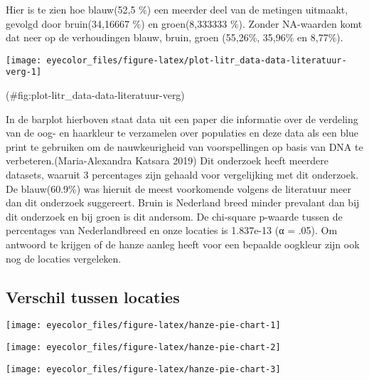 \documentclass[
]{article}
\let\origfigure\figure
\let\endorigfigure\endfigure
\renewenvironment{figure}[1][2] {
    \expandafter\origfigure\expandafter[H]
} {
    \endorigfigure
}
\begin{document}
Hier is te zien hoe blauw(52,5 \%) een meerder deel van de metingen
uitmaakt, gevolgd door bruin(34,16667 \%) en groen(8,333333 \%). Zonder
NA-waarden komt dat neer op de verhoudingen blauw, bruin, groen (55,26\%,
35,96\% en 8,77\%).

\begin{figure}
\texttt{[image: eyecolor\_files/figure-latex/plot-litr\_data-data-literatuur-verg-1]} \caption{Barplot met oogkleur in percentage voorkomst en oogkleur percentage uit data uit de literatuur. Meerderheid waargenomen door analisten van het rechter oogkleur. Oogkleur percentages van de literatuur gevonden op fsigenetics - "True colors: A literature review on the spatial distribution of eye and hair pigmentation" via researchgate}(\#fig:plot-litr_data-data-literatuur-verg)
\end{figure}

In de barplot hierboven staat data uit een paper die informatie over de
verdeling van de oog- en haarkleur te verzamelen over populaties en deze
data als een blue print te gebruiken om de nauwkeurigheid van
voorspellingen op basis van DNA te verbeteren.(Maria-Alexandra Katsara 2019) Dit
onderzoek heeft meerdere datasets, waaruit 3 percentages zijn gehaald
voor vergelijking met dit onderzoek. De blauw(60.9\%) was hieruit de
meest voorkomende volgens de literatuur meer dan dit onderzoek
suggereert. Bruin is Nederland breed minder prevalant dan bij dit
onderzoek en bij groen is dit andersom. De chi-square p-waarde tussen de
percentages van Nederlandbreed en onze locaties is 1.837e-13 (α = .05).
Om antwoord te krijgen of de hanze aanleg heeft voor een bepaalde
oogkleur zijn ook nog de locaties vergeleken.

\hypertarget{verschil-tussen-locaties}{%
\subsection{Verschil tussen locaties}\label{verschil-tussen-locaties}}

\begin{figure}
\texttt{[image: eyecolor\_files/figure-latex/hanze-pie-chart-1]} \caption{Drie taart grafieken die de tellingen tussen de oogkleuren per locatie vergelijken.}\label{fig:hanze-pie-chart-1}
\end{figure}
\begin{figure}
\texttt{[image: eyecolor\_files/figure-latex/hanze-pie-chart-2]} \caption{Drie taart grafieken die de tellingen tussen de oogkleuren per locatie vergelijken.}\label{fig:hanze-pie-chart-2}
\end{figure}
\begin{figure}
\texttt{[image: eyecolor\_files/figure-latex/hanze-pie-chart-3]} \caption{Drie taart grafieken die de tellingen tussen de oogkleuren per locatie vergelijken.}\label{fig:hanze-pie-chart-3}
\end{figure}
\end{document}
